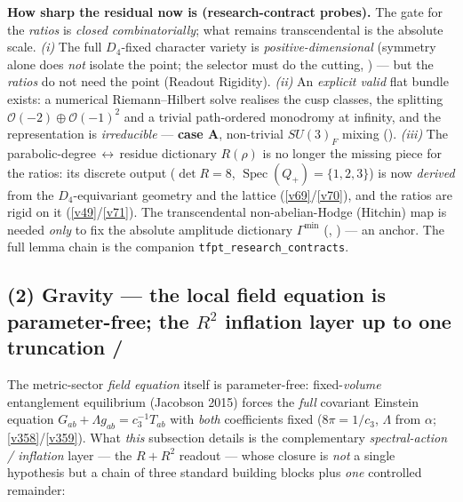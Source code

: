 \documentclass[11pt,a4paper]{article}
\newcommand{\cthree}{c_3}
\theoremstyle{definition}
\begin{document}
\smallskip
\noindent\textbf{How sharp the residual now is (research-contract probes).} The gate for the \emph{ratios} is
\emph{closed combinatorially}; what remains transcendental is the absolute scale. \emph{(i)} The full
$D_4$-fixed character variety is \emph{positive-dimensional} (symmetry alone does \emph{not} isolate the
point; the selector must do the cutting, ) --- but the \emph{ratios} do
not need the point (Readout Rigidity). \emph{(ii)} An \emph{explicit valid} flat bundle exists: a numerical
Riemann--Hilbert solve realises the cusp classes, the splitting $\mathcal O(-2)\oplus\mathcal O(-1)^2$ and a
trivial path-ordered monodromy at infinity, and the representation is \emph{irreducible} ---
\textbf{case A}, non-trivial $SU(3)_F$ mixing (). \emph{(iii)} The
parabolic-degree\,$\leftrightarrow$\,residue dictionary $R(\rho)$ is no longer the missing piece for the
ratios: its discrete output ($\det R=8$, $\operatorname{Spec}(Q_+)=\{1,2,3\}$) is now \emph{derived} from the
$D_4$-equivariant geometry and the lattice (\vref{v69}/\vref{v70}), and the ratios are rigid on it (\vref{v49}/\vref{v71}). The
transcendental non-abelian-Hodge (Hitchin) map is needed \emph{only} to fix the absolute amplitude dictionary
$\Gamma^{\min}$ (, ) --- an anchor. The full
lemma chain is the companion \texttt{tfpt\_research\_contracts}.

\subsection*{(2) Gravity --- the local field equation is parameter-free; the $R^2$ inflation layer up to one truncation \mE/\mC}
The metric-sector \emph{field equation} itself is parameter-free: fixed-\emph{volume} entanglement
equilibrium (Jacobson 2015) forces the \emph{full} covariant Einstein equation
$G_{ab}{+}\Lambda g_{ab}=\cthree^{-1}T_{ab}$ with \emph{both} coefficients fixed
($8\pi{=}1/\cthree$, $\Lambda$ from $\alpha$; \vref{v358}/\vref{v359}). What \emph{this} subsection details is
the complementary \emph{spectral-action / inflation} layer --- the $R+R^2$ readout --- whose closure is
\emph{not} a single hypothesis but a chain of three standard building blocks plus \emph{one} controlled
remainder:
\end{document}
